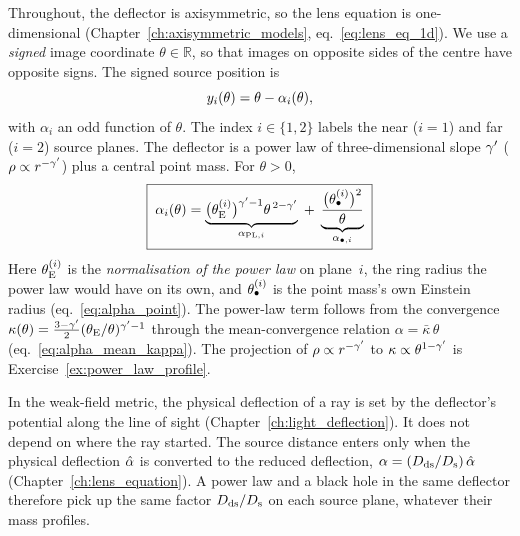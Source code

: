 Throughout, the deflector is axisymmetric, so the lens equation is
one-dimensional (Chapter~\ref{ch:axisymmetric_models},
eq.~\eqref{eq:lens_eq_1d}). We use a \emph{signed} image coordinate
$\theta\in\mathbb{R}$, so that images on opposite sides of the centre
have opposite signs. The signed source position is
\begin{equation}
  y_i(\theta) = \theta - \alpha_i(\theta),
  \label{eq:cb_lens_eq}
\end{equation}
with $\alpha_i$ an odd function of $\theta$. The index $i\in\{1,2\}$
labels the near ($i=1$) and far ($i=2$) source planes. The deflector is
a power law of three-dimensional slope $\gamma'$ ($\rho\propto r^{-\gamma'}$)
plus a central point mass. For $\theta>0$,
\begin{equation}
  \boxed{\;
  \alpha_i(\theta) =
  \underbrace{\big(\theta_{\mathrm{E}}^{(i)}\big)^{\gamma'-1}\theta^{\,2-\gamma'}}_{\alpha_{\mathrm{PL},i}}
  \;+\;
  \underbrace{\frac{\big(\theta_{\bullet}^{(i)}\big)^2}{\theta}}_{\alpha_{\bullet,i}}
  \;}
  \label{eq:cb_alpha_i}
\end{equation}
Here $\theta_{\mathrm{E}}^{(i)}$ is the \emph{normalisation of the power law} on
plane~$i$, the ring radius the power law would have on its own, and
$\theta_{\bullet}^{(i)}$ is the point mass's own Einstein radius
(eq.~\eqref{eq:alpha_point}). The power-law term follows from the
convergence $\kappa(\theta) = \tfrac{3-\gamma'}{2}(\theta_{\mathrm{E}}/\theta)^{\gamma'-1}$
through the mean-convergence relation $\alpha = \bar\kappa\,\theta$
(eq.~\eqref{eq:alpha_mean_kappa}). The projection of $\rho\propto r^{-\gamma'}$
to $\kappa\propto\theta^{1-\gamma'}$ is Exercise~\ref{ex:power_law_profile}.

\begin{aside}
In the weak-field metric, the physical deflection of a ray is set by
the deflector's potential along the line of sight
(Chapter~\ref{ch:light_deflection}). It does not depend on where the ray
started. The source distance enters only when the physical deflection
$\hat{\alpha}$ is converted to the reduced deflection,
$\alpha = (D_{\mathrm{ds}}/D_{\mathrm{s}})\,\hat{\alpha}$ (Chapter~\ref{ch:lens_equation}). A
power law and a black hole in the same deflector therefore pick up the
same factor $D_{\mathrm{ds}}/D_{\mathrm{s}}$ on each source plane, whatever their mass
profiles.
\end{aside}

